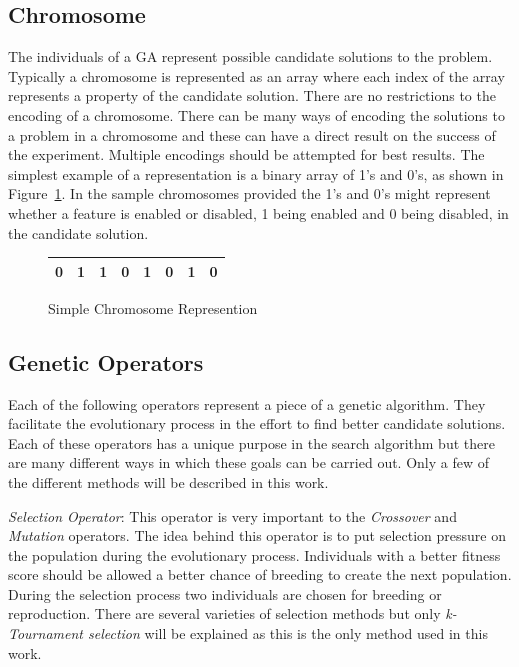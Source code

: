 \subsection{Chromosome}

The individuals of a GA represent possible candidate solutions to the problem. Typically a chromosome is represented as an array where each index of the array represents a property of the candidate solution. There are no restrictions to the encoding of a chromosome. There can be many ways of encoding the solutions to a problem in a chromosome and these can have a direct result on the success of the experiment. Multiple encodings should be attempted for best results. The simplest example of a representation is a binary array of 1's and 0's, as shown in Figure~\ref{fig:sampleChromosome}. In the sample chromosomes provided the 1's and 0's might represent whether a feature is enabled or disabled, 1 being enabled and 0 being disabled, in the candidate solution.

\begin{figure}[H]
  \label{fig:sampleChromosome}
  \centering
  \begin{tabular}{ | l | l | l | l | l | l | l | l | }
    \hline
    0 & 1 & 1 & 0 & 1 & 0 & 1 & 0 \\
    \hline
  \end{tabular}
  \caption{Simple Chromosome Represention}
\end{figure}

\subsection{Genetic Operators}
\label{subsec:ga-operators}

Each of the following operators represent a piece of a genetic algorithm. They facilitate the evolutionary process in the effort to find better candidate solutions. Each of these operators has a unique purpose in the search algorithm but there are many different ways in which these goals can be carried out. Only a few of the different methods will be described in this work.

\textit{Selection Operator}: This operator is very important to the \textit{Crossover} and \textit{Mutation} operators. The idea behind this operator is to put selection pressure on the population during the evolutionary process. Individuals with a better fitness score should be allowed a better chance of breeding to create the next population. During the selection process two individuals are chosen for breeding or reproduction. There are several varieties of selection methods but only \textit{k-Tournament selection} will be explained as this is the only method used in this work.

